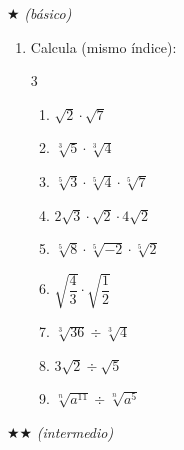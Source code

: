 \documentclass[11pt, letterpaper]{article}
\begin{document}
$\bigstar$ \textit{(básico)}

\begin{enumerate}[label=\textbf{\arabic*.}, leftmargin=*]
  \item Calcula (mismo índice):
  \begin{multicols}{3}
  \begin{enumerate}[label=\alph*)]
    \item $\sqrt{2}\cdot\sqrt{7}$
    \item $\sqrt[3]{5}\cdot\sqrt[3]{4}$
    \item $\sqrt[5]{3}\cdot\sqrt[5]{4}\cdot\sqrt[5]{7}$
    \item $2\sqrt{3}\cdot\sqrt{2}\cdot 4\sqrt{2}$
    \item $\sqrt[5]{8}\cdot\sqrt[5]{-2}\cdot\sqrt[5]{2}$
    \item $\sqrt{\dfrac{4}{3}}\cdot\sqrt{\dfrac{1}{2}}$
    \item $\sqrt[3]{36}\div\sqrt[3]{4}$
    \item $3\sqrt{2}\div\sqrt{5}$
    \item $\sqrt[n]{a^{11}}\div\sqrt[n]{a^5}$
  \end{enumerate}
  \end{multicols}
\end{enumerate}

$\bigstar\bigstar$ \textit{(intermedio)}
\end{document}
